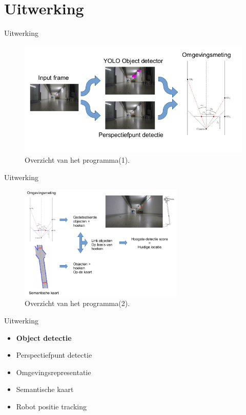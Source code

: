 \documentclass[11pt,t]{beamer}
\begin{document}
\section{Uitwerking}
\begin{frame}[fragile]{Uitwerking}
	\begin{figure}
		\centering
		\includegraphics[width=\textwidth]{graphics/pipeline1.png}
		\caption{Overzicht van het programma(1).}
	\end{figure}
\end{frame}
\begin{frame}[fragile]{Uitwerking}
	\begin{figure}
		\centering
		\includegraphics[width=0.7\textwidth]{graphics/pipeline2.png}
		\caption{Overzicht van het programma(2).}
	\end{figure}
\end{frame}

\begin{frame}[fragile]{Uitwerking}
	\begin{itemize}
		\item \textbf{Object detectie}
		\item Perspectiefpunt detectie
		\item Omgevingsrepresentatie
		\item Semantische kaart
		\item Robot positie tracking
	\end{itemize}
\end{frame}
\end{document}
